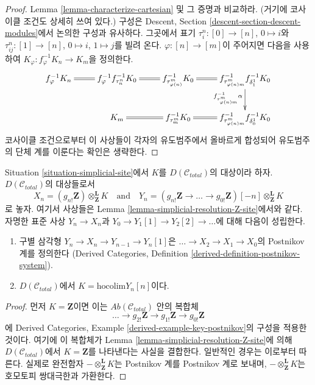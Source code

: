 \begin{proof}
Lemma \ref{lemma-characterize-cartesian} 및 그 증명과 비교하라.
(거기에 코사이클 조건도 상세히 쓰여 있다.)
구성은 Descent, Section \ref{descent-section-descent-modules}에서
논의한 구성과 유사하다. 그곳에서 표기
$\tau^n_i : [0] \to [n]$, $0 \mapsto i$와
$\tau^n_{ij} : [1] \to [n]$, $0 \mapsto i$, $1 \mapsto j$를 빌려 온다.
$\varphi : [n] \to [m]$이 주어지면 다음을 사용하여
$K_\varphi : f_\varphi^{-1}K_n \to K_m$을 정의한다.
$$
\xymatrix{
f_\varphi^{-1}K_n \ar@{=}[r] &
f_\varphi^{-1} f_{\tau^n_n}^{-1}K_0 \ar@{=}[r] &
f_{\tau^m_{\varphi(n)}}^{-1}K_0 \ar@{=}[r] &
f_{\tau^m_{\varphi(n)m}}^{-1}f_{\delta^1_1}^{-1}K_0
\ar[d]_{f_{\tau^m_{\varphi(n)m}}^{-1}\alpha} \\
&
K_m \ar@{=}[r] &
f_{\tau^m_m}^{-1}K_0 \ar@{=}[r] &
f_{\tau^m_{\varphi(n)m}}^{-1}f_{\delta^1_0}^{-1}K_0
}
$$
코사이클 조건으로부터 이 사상들이 각자의 유도범주에서 올바르게
합성되어 유도범주의 단체 계를 이룬다는 확인은 생략한다.
\end{proof}

\begin{lemma}
\label{lemma-abelian-postnikov}
Situation \ref{situation-simplicial-site}에서
$K$를 $D(\mathcal{C}_{total})$의 대상이라 하자.
$D(\mathcal{C}_{total})$의 대상들로서
$$
X_n = (g_{n!}\mathbf{Z})
\otimes^\mathbf{L}_\mathbf{Z} K
\quad\text{and}\quad
Y_n =
(g_{n!}\mathbf{Z} \to \ldots \to g_{0!}\mathbf{Z})[-n]
\otimes^\mathbf{L}_\mathbf{Z} K
$$
로 놓자. 여기서 사상들은 Lemma
\ref{lemma-simplicial-resolution-Z-site}에서와 같다.
자명한 표준 사상 $Y_n \to X_n$과
$Y_0 \to Y_1[1] \to Y_2[2] \to \ldots$에 대해 다음이 성립한다.
\begin{enumerate}
\item 구별 삼각형 $Y_n \to X_n \to Y_{n - 1} \to Y_n[1]$은
$\ldots \to X_2 \to X_1 \to X_0$의 Postnikov 계를 정의한다
(Derived Categories, Definition
\ref{derived-definition-postnikov-system}).
\item $D(\mathcal{C}_{total})$에서
$K = \text{hocolim} Y_n[n]$이다.
\end{enumerate}
\end{lemma}

\begin{proof}
먼저 $K = \mathbf{Z}$이면 이는
$\textit{Ab}(\mathcal{C}_{total})$ 안의 복합체
$$
\ldots \to
g_{2!}\mathbf{Z} \to
g_{1!}\mathbf{Z} \to
g_{0!}\mathbf{Z}
$$
에 Derived Categories, Example
\ref{derived-example-key-postnikov}의 구성을 적용한 것이다.
여기에 이 복합체가 Lemma
\ref{lemma-simplicial-resolution-Z-site}에 의해
$D(\mathcal{C}_{total})$에서 $K = \mathbf{Z}$를 나타낸다는 사실을 결합한다.
일반적인 경우는 이로부터 따른다. 실제로 완전함자
$- \otimes^\mathbf{L}_\mathbf{Z} K$는 Postnikov 계를
Postnikov 계로 보내며,
$- \otimes^\mathbf{L}_\mathbf{Z} K$는 호모토피 쌍대극한과 가환한다.
\end{proof}

